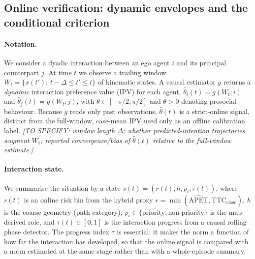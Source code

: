 
\subsection{Online verification: dynamic envelopes and the conditional criterion}

\paragraph{Notation.}
We consider a dyadic interaction between an ego agent $i$ and its principal counterpart
$j$. At time $t$ we observe a trailing window $W_t=\{x(t'):\,t-\Delta\le t'\le t\}$ of
kinematic states. A causal estimator $g$ returns a \emph{dynamic} interaction preference
value (IPV) for each agent, $\hat\theta_i(t)=g(W_t;i)$ and $\hat\theta_j(t)=g(W_t;j)$, with
$\theta\in[-\pi/2,\pi/2]$ and $\theta>0$ denoting prosocial behaviour. Because $g$ reads only
past observations, $\hat\theta(t)$ is a strict-online signal, distinct from the full-window,
case-mean IPV used only as an offline calibration label.
\emph{[TO SPECIFY: window length $\Delta$; whether predicted-intention trajectories augment
$W_t$; reported convergence/bias of $\hat\theta(t)$ relative to the full-window estimate.]}

\paragraph{Interaction state.}
We summarise the situation by a state $s(t)=(r(t),h,\rho_i,\tau(t))$, where $r(t)$ is an
online risk bin from the hybrid proxy $r=\min(\widehat{\mathrm{APET}},\mathrm{TTC}_{\mathrm{close}})$,
$h$ is the coarse geometry (path category), $\rho_i\in\{\text{priority},\text{non-priority}\}$
is the map-derived role, and $\tau(t)\in[0,1]$ is the interaction progress from a causal
rolling-phase detector. The progress index $\tau$ is essential: it makes the norm a function
of how far the interaction has developed, so that the online signal is compared with a norm
estimated at the same stage rather than with a whole-episode summary.

